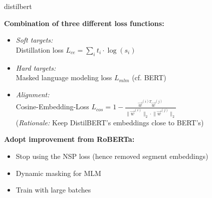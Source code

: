\begin{frame}{distilbert}

\vfill

\textbf{Combination of three different loss functions:}

\begin{itemize}
	\item \textit{Soft targets:}\\Distillation loss $L_{ce} = \sum_i t_i \cdot \log(s_i)$
	\item \textit{Hard targets:}\\Masked language modeling loss $L_{mlm}$ (cf. BERT)
	\item \textit{Alignment:}\\Cosine-Embedding-Loss $L_{cos} = 1 - \frac{\vec w^{(i)T}\vec w^{(j)}}{\lVert \vec w^{(i)} \rVert_2 \cdot \lVert \vec w^{(j)}\lVert_2}$\\
				(\textit{Rationale:} Keep DistilBERT's embeddings close to BERT's)
\end{itemize}

\vspace{.3cm}

\textbf{Adopt improvement from RoBERTa:}

\begin{itemize}
	\item Stop using the NSP loss (hence removed segment embeddings)
	\item Dynamic masking for MLM
	\item Train with large batches
\end{itemize}

\vfill

\end{frame}


